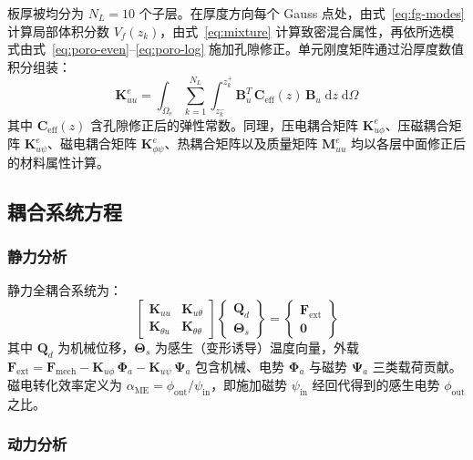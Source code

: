 \documentclass[11pt,a4paper]{ctexart}
\newcommand{\dd}{\mathrm{d}}
\begin{document}
板厚被均分为 $N_L = 10$ 个子层。在厚度方向每个 Gauss 点处，由式~\eqref{eq:fg-modes} 计算局部体积分数 $V_f(z_k)$，由式~\eqref{eq:mixture} 计算致密混合属性，再依所选模式由式~\eqref{eq:poro-even}--\eqref{eq:poro-log} 施加孔隙修正。单元刚度矩阵通过沿厚度数值积分组装：
\begin{equation}
\bm{K}_{uu}^e = \int_{\Omega_e}\sum_{k=1}^{N_L}\int_{z_k^-}^{z_k^+} \bm{B}_u^T\,\bm{C}_{\text{eff}}(z)\,\bm{B}_u\;\dd z\;\dd\Omega
\end{equation}
其中 $\bm{C}_{\text{eff}}(z)$ 含孔隙修正后的弹性常数。同理，压电耦合矩阵 $\bm{K}_{u\phi}^e$、压磁耦合矩阵 $\bm{K}_{u\psi}^e$、磁电耦合矩阵 $\bm{K}_{\phi\psi}^e$、热耦合矩阵以及质量矩阵 $\bm{M}_{uu}^e$ 均以各层中面修正后的材料属性计算。

\subsection{耦合系统方程}

\subsubsection{静力分析}

静力全耦合系统为：
\begin{equation}
\begin{bmatrix}
\bm{K}_{uu} & \bm{K}_{u\theta} \\
\bm{K}_{\theta u} & \bm{K}_{\theta\theta}
\end{bmatrix}
\begin{Bmatrix}
\bm{Q}_d \\ \bm{\Theta}_s
\end{Bmatrix}
=
\begin{Bmatrix}
\bm{F}_{\text{ext}} \\ \bm{0}
\end{Bmatrix}
\label{eq:static-system}
\end{equation}
其中 $\bm{Q}_d$ 为机械位移，$\bm{\Theta}_s$ 为感生（变形诱导）温度向量，外载 $\bm{F}_{\text{ext}} = \bm{F}_{\text{mech}} - \bm{K}_{u\phi}\,\bm{\Phi}_a - \bm{K}_{u\psi}\,\bm{\Psi}_a$ 包含机械、电势 $\bm{\Phi}_a$ 与磁势 $\bm{\Psi}_a$ 三类载荷贡献。磁电转化效率定义为 $\alpha_{\text{ME}} = \phi_{\text{out}}/\psi_{\text{in}}$，即施加磁势 $\psi_{\text{in}}$ 经回代得到的感生电势 $\phi_{\text{out}}$ 之比。

\subsubsection{动力分析}
\end{document}
